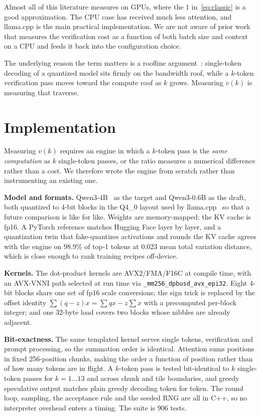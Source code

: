 \documentclass[conference]{IEEEtran}
\begin{document}
Almost all of this literature measures on GPUs, where the $1$ in~\eqref{eq:classic} is a good
approximation. The CPU case has received much less attention, and llama.cpp is the main practical
implementation. We are not aware of prior work that measures the verification cost as a function of
both batch size and context on a CPU and feeds it back into the configuration choice.

The underlying reason the term matters is a roofline argument~\cite{williams2009}: single-token
decoding of a quantized model sits firmly on the bandwidth roof, while a $k$-token verification pass
moves toward the compute roof as $k$ grows. Measuring $v(k)$ is measuring that traverse.

\section{Implementation}

Measuring $v(k)$ requires an engine in which a $k$-token pass is the \emph{same computation} as $k$
single-token passes, or the ratio measures a numerical difference rather than a cost. We therefore
wrote the engine from scratch rather than instrumenting an existing one.

\textbf{Model and formats.} Qwen3-4B~\cite{qwen3} as the target and Qwen3-0.6B as the draft, both
quantized to 4-bit blocks in the Q4\_0 layout used by llama.cpp~\cite{llamacpp} so that a future
comparison is like for like. Weights are memory-mapped; the KV cache is fp16. A PyTorch
reference matches Hugging Face layer by layer, and a quantization twin that fake-quantizes
activations and rounds the KV cache agrees with the engine on 98.9\% of top-1 tokens at 0.023 mean
total variation distance, which is close enough to rank training recipes off-device.

\textbf{Kernels.} The dot-product kernels are AVX2/FMA/F16C at compile time, with an AVX-VNNI path
selected at run time via \texttt{\_mm256\_dpbusd\_avx\_epi32}. Eight 4-bit blocks share one set of
fp16 scale conversions; the sign trick is replaced by the offset identity $\sum (q-z)x = \sum qx - z
\sum x$ with a precomputed per-block integer; and one 32-byte load covers two blocks whose nibbles
are already adjacent.

\textbf{Bit-exactness.} The same templated kernel serves single tokens, verification and prompt
processing, so the summation order is identical. Attention sums positions in fixed 256-position
chunks, making the order a function of position rather than of how many tokens are in flight. A
$k$-token pass is tested bit-identical to $k$ single-token passes for $k = 1 \ldots 13$ and across
chunk and tile boundaries, and greedy speculative output matches plain greedy decoding token for
token. The round loop, sampling, the acceptance rule and the seeded RNG are all in C++, so no
interpreter overhead enters a timing. The suite is 906 tests.
\end{document}
